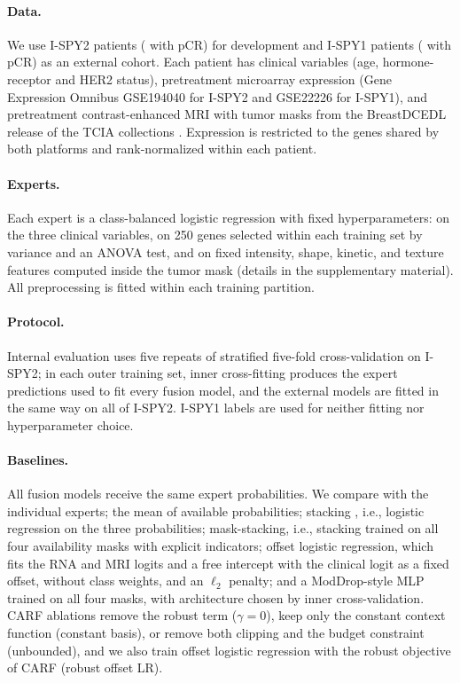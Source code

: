 \documentclass[runningheads]{llncs}
\begin{document}
\paragraph{Data.} We use \NDev{} I-SPY2 patients (\NDevPos{} with pCR) for development and \NExt{} I-SPY1 patients (\NExtPos{} with pCR) as an external cohort. Each patient has clinical variables (age, hormone-receptor and HER2 status), pretreatment microarray expression (Gene Expression Omnibus GSE194040 for I-SPY2 \cite{wolf2022ispy} and GSE22226 for I-SPY1), and pretreatment contrast-enhanced MRI with tumor masks from the BreastDCEDL release \cite{fridman2026} of the TCIA collections \cite{tciaispy1,tciaispy2}. Expression is restricted to the \NGenes{} genes shared by both platforms and rank-normalized within each patient.

\paragraph{Experts.} Each expert is a class-balanced logistic regression with fixed hyperparameters: on the three clinical variables, on 250 genes selected within each training set by variance and an ANOVA test, and on \NMriFeat{} fixed intensity, shape, kinetic, and texture features computed inside the tumor mask (details in the supplementary material). All preprocessing is fitted within each training partition.

\paragraph{Protocol.} Internal evaluation uses five repeats of stratified five-fold cross-validation on I-SPY2; in each outer training set, inner cross-fitting produces the expert predictions used to fit every fusion model, and the external models are fitted in the same way on all of I-SPY2. I-SPY1 labels are used for neither fitting nor hyperparameter choice.

\paragraph{Baselines.} All fusion models receive the same expert probabilities. We compare with the individual experts; the mean of available probabilities; stacking \cite{wolpert1992}, i.e., logistic regression on the three probabilities; mask-stacking, i.e., stacking trained on all four availability masks with explicit indicators; offset logistic regression, which fits the RNA and MRI logits and a free intercept with the clinical logit as a fixed offset, without class weights, and an $\ell_2$ penalty; and a ModDrop-style MLP \cite{neverova2015} trained on all four masks, with architecture chosen by inner cross-validation. CARF ablations remove the robust term ($\gamma=0$), keep only the constant context function (constant basis), or remove both clipping and the budget constraint (unbounded), and we also train offset logistic regression with the robust objective of CARF (robust offset LR).
\end{document}
